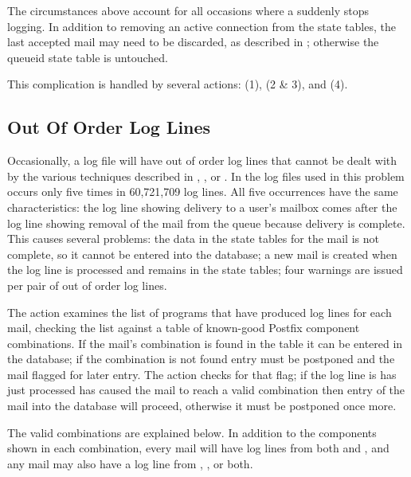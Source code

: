 The circumstances above account for all occasions where a 
suddenly stops logging.  In addition to removing an active connection from
the state tables, the last accepted mail may need to be discarded, as
described in ; otherwise the queueid
state table is untouched.

This complication is handled by several actions:  (1),
 (2 \& 3), and  (4).


\subsection{Out Of Order Log Lines}

\label{out of order log lines}

Occasionally, a log file will have out of order log lines that cannot be
dealt with by the various techniques described in , , or
.  In the \numberOFlogFILES{} log
files used in  this problem occurs only five times
in 60,721,709 log lines.  All five occurrences have the same
characteristics: the  log line showing delivery to a user's
mailbox comes after the  log line showing removal of the mail
from the queue because delivery is complete.  This causes several problems:
the data in the state tables for the mail is not complete, so it cannot be
entered into the database; a new mail is created when the 
log line is processed and remains in the state tables; four warnings are
issued per pair of out of order log lines.

The  action examines the list of programs that have produced
log lines for each mail, checking the list against a table of known-good
Postfix component combinations.  If the mail's combination is found in the
table it can be entered in the database; if the combination is not found
entry must be postponed and the mail flagged for later entry.  The
 action checks for that flag; if the log line is
has just processed has caused the mail to reach a valid combination then
entry of the mail into the database will proceed, otherwise it must be
postponed once more.

The valid combinations are explained below.  In addition to the components
shown in each combination, every mail will have log lines from both
 and , and any mail may also have a log line
from , , or both.

